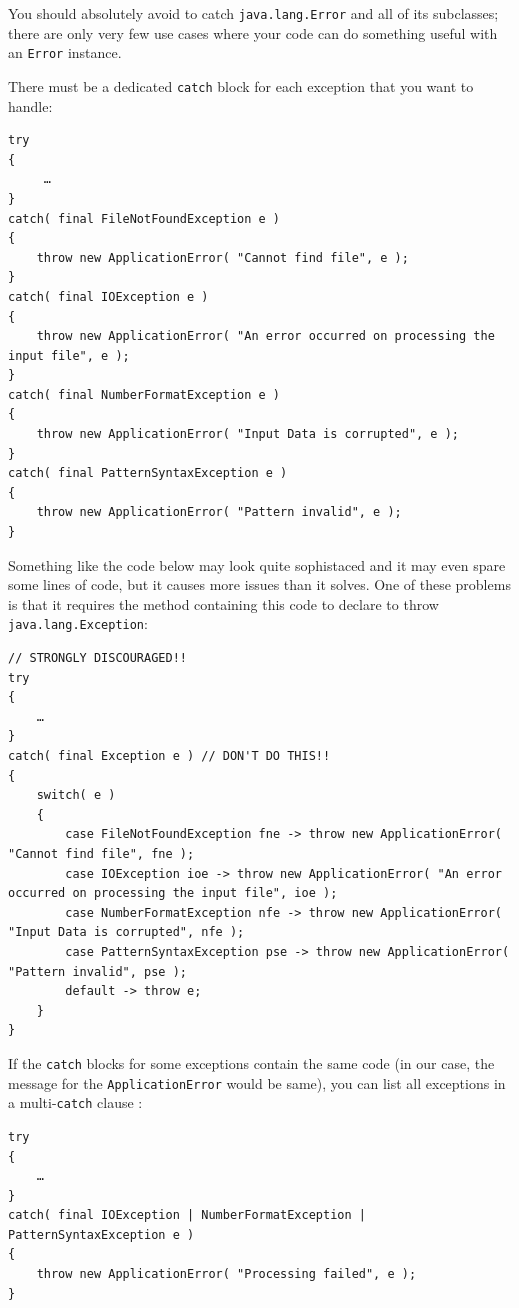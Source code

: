 You should absolutely avoid to catch \lstinline|java.lang.Error| and all of its subclasses; there are only very few use cases where your code can do something useful with an \lstinline|Error| instance.

There must be a dedicated \lstinline|catch| block for each exception that you want to handle:
\begin{lstlisting}
try
{
     …
}
catch( final FileNotFoundException e )
{
    throw new ApplicationError( "Cannot find file", e );
}
catch( final IOException e )
{
    throw new ApplicationError( "An error occurred on processing the input file", e );
}
catch( final NumberFormatException e )
{
    throw new ApplicationError( "Input Data is corrupted", e );
}
catch( final PatternSyntaxException e )
{
    throw new ApplicationError( "Pattern invalid", e );
}
\end{lstlisting}

Something like the code below may look quite sophistaced and it may even spare some lines of code, but it causes more issues than it solves. One of these problems is that it requires the method containing this code to declare to throw \lstinline|java.lang.Exception|:
\begin{lstlisting}
// STRONGLY DISCOURAGED!!
try
{
    …
}
catch( final Exception e ) // DON'T DO THIS!!
{
    switch( e )
    {
        case FileNotFoundException fne -> throw new ApplicationError( "Cannot find file", fne );
        case IOException ioe -> throw new ApplicationError( "An error occurred on processing the input file", ioe );
        case NumberFormatException nfe -> throw new ApplicationError( "Input Data is corrupted", nfe );
        case PatternSyntaxException pse -> throw new ApplicationError( "Pattern invalid", pse );
        default -> throw e;
    }
}
\end{lstlisting}

If the \lstinline|catch| blocks for some exceptions contain the same code (in our case, the message for the \lstinline|ApplicationError| would be same), you can list all exceptions in a multi-\lstinline|catch| clause \autocite{ORACLE_DOC_LANGUAGE_SPECIFICATION:Try}:
\begin{lstlisting}
try
{
    …
}
catch( final IOException | NumberFormatException | PatternSyntaxException e )
{
    throw new ApplicationError( "Processing failed", e );
}
\end{lstlisting}

